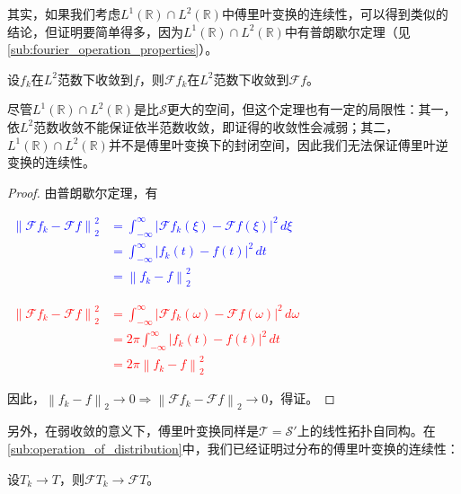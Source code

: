 \documentclass{ctexbook}
\newcommand{\lr}[2]{%
    \begin{center}
    \begin{minipage}[t]{0.45\textwidth}
        \centering
        \allowdisplaybreaks
        \textcolor{blue}{%
            \begin{varwidth}{\linewidth}
            $\begin{aligned}
            #1
            \end{aligned}$
            \end{varwidth}
        }
    \end{minipage}
    \hfill
    \begin{minipage}[t]{0.45\textwidth}
        \centering
        \allowdisplaybreaks
        \textcolor{red}{%
            \begin{varwidth}{\linewidth}
            $\begin{aligned}
            #2
            \end{aligned}$
            \end{varwidth}
        }
    \end{minipage}
\end{center}
}
\begin{document}
其实，如果我们考虑$L^1(\mathbb{R})\cap L^2(\mathbb{R})$中傅里叶变换的连续性，可以得到类似的结论，但证明要简单得多，因为$L^1(\mathbb{R})\cap L^2(\mathbb{R})$中有普朗歇尔定理（见\ref{sub:fourier_operation_properties}）。
\begin{theorem}
    设$f_k$在$L^2$范数下收敛到$f$，则$\mathcal{F} f_k$在$L^2$范数下收敛到$\mathcal{F} f$。
\end{theorem}
\begin{remark}
    尽管$L^1(\mathbb{R})\cap L^2(\mathbb{R})$是比$\mathcal{S} $更大的空间，但这个定理也有一定的局限性：其一，依$L^2$范数收敛不能保证依半范数收敛，即证得的收敛性会减弱；其二，$L^1(\mathbb{R})\cap L^2(\mathbb{R})$并不是傅里叶变换下的封闭空间，因此我们无法保证傅里叶逆变换的连续性。
\end{remark}
\begin{proof}
    由普朗歇尔定理，有
    \lr{
    \left\|\mathcal{F} f_k-\mathcal{F} f\right\|_2^2&=\int_{-\infty}^{\infty}\left|\mathcal{F} f_k(\xi)-\mathcal{F} f(\xi)\right|^2\,d\xi\\
    &=\int_{-\infty}^{\infty}\left|f_k(t)-f(t)\right|^2\,dt\\
    &=\left\|f_k-f\right\|_2^2
    }{
    \left\|\mathcal{F} f_k-\mathcal{F} f\right\|_2^2&=\int_{-\infty}^{\infty}\left|\mathcal{F} f_k(\omega)-\mathcal{F} f(\omega)\right|^2\,d\omega\\
    &=2\pi\int_{-\infty}^{\infty}\left|f_k(t)-f(t)\right|^2\,dt\\
    &=2\pi\left\|f_k-f\right\|_2^2
    }
    因此，$\left\|f_k-f\right\|_2\to 0\Rightarrow \left\|\mathcal{F} f_k-\mathcal{F} f\right\|_2\to 0$，得证。
\end{proof}

另外，在弱收敛的意义下，傅里叶变换同样是$\mathcal{T} =\mathcal{S} ' $上的线性拓扑自同构。在\ref{sub:operation_of_distribution}中，我们已经证明过分布的傅里叶变换的连续性：\begin{theorem}
    设$T_k\to T$，则$\mathcal{F} T_k\to \mathcal{F} T$。
\end{theorem}

\printbibliography[heading=bibintoc, title={参考文献}]
\end{document}
